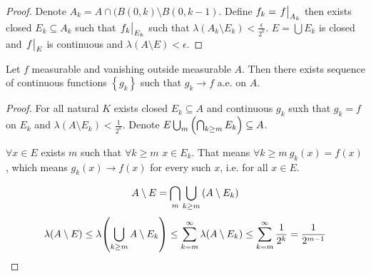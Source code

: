 \begin{theorem}
\begin{proof}
		Denote $A_k = A\cap (B(0,k) \setminus B(0,k-1)$. Define $f_k =\eval{f}_{A_k}$ then exists closed $E_k\subseteq A_k$ such that $\eval{f_k}_{E_k}$ such that $\lambda(A_k\setminus E_k)  < \frac{\epsilon}{2^k}$. $E=\bigcup E_k$ is closed and $\eval{f}_E$ is continuous and $\lambda(A\setminus E) < \epsilon$.
		\end{proof}
	
	\begin{coll}
		Let $f$ measurable and vanishing outside measurable $A$. Then there exists sequence of continuous functions $\left\{ g_k\right\}$ such that $g_k\to f$ a.e. on $A$.
		\begin{proof}
			For all natural $K$ exists closed $E_k\subseteq A$ and continuous $g_k$ suxh that $g_k=f$ on $E_k$ and $\lambda(A\setminus E_k) < \frac{1}{2^k}$. Denote $E \bigcup_m \qty(\bigcap_{k\geq m} E_k) \subseteq A$.
			
			
			$\forall x \in E$ exists $m$ such that $\forall k\geq m$ $x\in E_k$. That means $\forall k\geq m \: g_k(x) = f(x)$, which means $g_k(x) \to f(x)$ for every such $x$, i.e. for all $x\in E$.
			
			$$A\setminus E = \bigcap_m \bigcup_{k\geq m} \qty(A\setminus E_k)$$
			$$\lambda(A\setminus E) \leq \lambda\qty(\bigcup_{k\geq m} A\setminus E_k) \leq \sum_{k=m}^\infty \lambda(A\setminus E_k) \leq \sum_{k=m}^\infty\frac{1}{2^k} = \frac{1}{2^{m-1}}$$
		\end{proof}
	\end{coll}
\end{theorem}